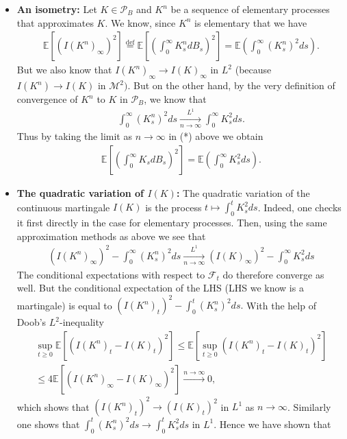 \documentclass[../mainfile.tex]{subfiles}
\begin{document}
\begin{itemize}
\item \textbf{An isometry:} Let $K \in \mathcal{P}_B$ and $K^n$ be a sequence of elementary processes that approximates $K$. We know, since $K^n$ is elementary that we have 
\begin{align*}
\mathbb{E}[(I(K^n)_\infty)^2] \overset{\text{def}}= \mathbb{E}\left[ \left( \int_0^\infty K_s^n dB_s \right)^2 \right] = \mathbb{E} \left( \int_0^\infty (K_s^n)^2 ds \right). \tag{*}
\end{align*}
But we also know that $I(K^n)_\infty \to I(K)_\infty$ in $L^2$ (because $I(K^n) \to I(K)$ in $\mathcal{M}^2)$. But on the other hand, by the very definition of convergence of $K^n$ to $K$ in $\mathcal{P}_B$, we know that 
\begin{align*}
\int_0^\infty (K_s^n)^2 ds \xrightarrow[n \to \infty]{L^1} \int_0^\infty K_s^2 ds. 
\end{align*}
Thus by taking the limit as $n \to \infty$ in (*) above we obtain 
\begin{align*}
\mathbb{E}\left[\left( \int_0^\infty K_s dB_s \right)^2  \right] = \mathbb{E} \left( \int_0^\infty K_s^2 ds \right). 
\end{align*}
\item \textbf{The quadratic variation of $I(K)$:} The quadratic variation of the continuous martingale $I(K)$ is the process $t \mapsto \int_0^tK_s^2 ds$. Indeed, one checks it first directly in the case for elementary processes. Then, using the same approximation methods as above we see that 
\begin{align*}
(I(K^n)_\infty)^2 - \int_0^\infty (K_s^n)^2 ds \xrightarrow[n \to \infty]{L^1} (I(K)_\infty)^2- \int_0^\infty K_s^2 ds 
\end{align*}
The conditional expectations with respect to $\mathcal{F}_t$ do therefore converge as well. But the conditional expectation of the LHS (LHS we know is a martingale) is equal to $(I(K^n)_t)^2- \int_0^t(K_s^n)^2 ds.$ With the help of Doob's $L^2$-inequality 
\begin{align*}
\sup_{t \geq 0} \mathbb{E}\left[ \left( I(K^n)_t-I(K)_t\right)^2 \right] \leq \mathbb{E} \left[ \sup_{t \geq 0 }  \left( I(K^n)_t-I(K)_t\right)^2 \right]\\
\leq 4 \mathbb{E} \left[ (I(K^n)_\infty - I(K)_\infty)^2\right] \xrightarrow{n \to \infty} 0, 
\end{align*}
which shows that $(I(K^n)_t)^2 \to (I(K)_t)^2$ in $L^1$ as $n \to \infty$. Similarly one shows that $\int_0^t (K_s^n)^2 ds \to \int_0^t K_s^2 ds$ in $L^1$. Hence we have shown that \begin{align*}

\end{align*}
\end{itemize}
\end{document}
